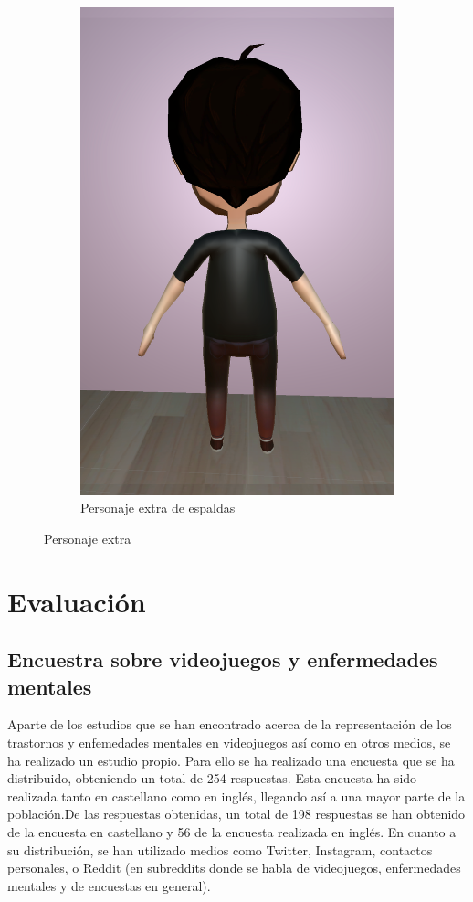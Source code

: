 \documentclass[12pt, a4paper,twoside,titlepage]{book}
\begin{document}
\begin{figure}
\begin{subfigure}{.5\textwidth}
  \includegraphics[width=.95\linewidth]{TGF/Artes/EVIL_back.png}
  \caption{Personaje extra de espaldas}
\end{subfigure}
\caption{Personaje extra}
\label{fig:ArtesEVIL2}
\end{figure}


\chapter {Evaluación}

\section{Encuestra sobre videojuegos y enfermedades mentales}
\label{sec:encuestaVid}
Aparte de los estudios que se han encontrado acerca de la representación de los trastornos y enfemedades mentales en videojuegos así como en otros medios, se ha realizado un estudio propio. Para ello se ha realizado una encuesta que se ha distribuido, obteniendo un total de 254 respuestas. Esta encuesta ha sido realizada tanto en castellano como en inglés, llegando así a una mayor parte de la población.De las respuestas obtenidas, un total de 198 respuestas se han obtenido de la encuesta en castellano y 56 de la encuesta realizada en inglés. En cuanto a su distribución, se han utilizado medios como Twitter, Instagram, contactos personales, o Reddit (en subreddits donde se habla de videojuegos, enfermedades mentales y de encuestas en general). 
\end{document}
